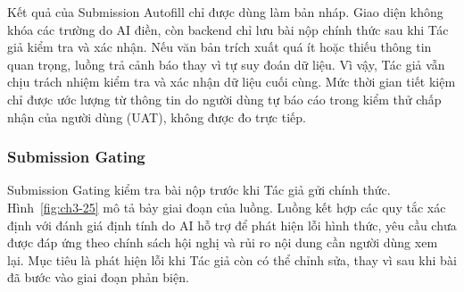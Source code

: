 Kết quả của Submission Autofill chỉ được dùng làm bản nháp. Giao diện không khóa các trường do AI điền, còn backend chỉ lưu bài nộp chính thức sau khi Tác giả kiểm tra và xác nhận. Nếu văn bản trích xuất quá ít hoặc thiếu thông tin quan trọng, luồng trả cảnh báo thay vì tự suy đoán dữ liệu. Vì vậy, Tác giả vẫn chịu trách nhiệm kiểm tra và xác nhận dữ liệu cuối cùng. Mức thời gian tiết kiệm chỉ được ước lượng từ thông tin do người dùng tự báo cáo trong kiểm thử chấp nhận của người dùng (UAT), không được đo trực tiếp.

\subsubsection{Submission Gating}

Submission Gating kiểm tra bài nộp trước khi Tác giả gửi chính thức. Hình~\ref{fig:ch3-25} mô tả bảy giai đoạn của luồng. Luồng kết hợp các quy tắc xác định với đánh giá định tính do AI hỗ trợ để phát hiện lỗi hình thức, yêu cầu chưa được đáp ứng theo chính sách hội nghị và rủi ro nội dung cần người dùng xem lại. Mục tiêu là phát hiện lỗi khi Tác giả còn có thể chỉnh sửa, thay vì sau khi bài đã bước vào giai đoạn phản biện.

